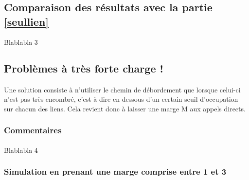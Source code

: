         \subsection{Comparaison des résultats avec la partie \ref{seullien}}
Blablabla 3

%
%
    \clearpage
%
%
        \subsection{Problèmes à très forte charge !}
%
            \paragraph{}
Une solution consiste à n'utiliser le chemin de débordement que lorsque celui-ci n'est pas très encombré, c'est à dire en dessous d'un certain seuil d'occupation sur chacun des liens.
Cela revient donc à laisser une marge M aux appels directs.
%
%
            \subsubsection{Commentaires}
%
                \paragraph{}
Blablabla 4
%
%
            \subsubsection{Simulation en prenant une marge comprise entre 1 et 3}
%
